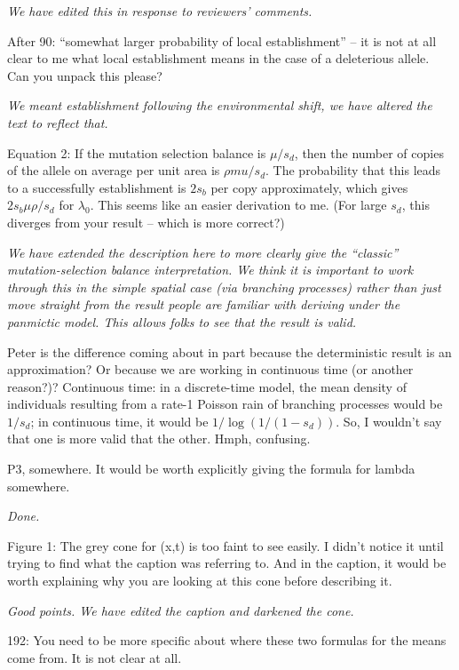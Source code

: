 \documentclass[12pt,letterpaper]{article}
\newcommand{\gc}[1]{{ \color{red} #1}}
\newcommand{\plr}[1]{{ \color{green} #1}}
\newcommand{\response}[1]{\emph{ \color{blue} #1}}
\begin{document}
\response{We have edited this in response to reviewers' comments.}


After 90: ``somewhat larger probability of local establishment'' -- it is not at all clear to me what local establishment means in the case of a deleterious allele. Can you unpack this please?

\response{We meant establishment following the environmental shift, we have altered the text to reflect that.}

Equation 2: If the mutation selection balance is $\mu/s_d$, then the number of copies of the allele on average per unit area is $\rho mu/ s_d$. The probability that this leads to a successfully establishment is $2 s_b$ per copy approximately, which gives $2 s_b \mu \rho / s_d$ for $\lambda_0$. This seems like an easier derivation to me. (For large $s_d$, this diverges from your result -- which is more correct?)

\response{We have extended the description here to more clearly give the ``classic'' mutation-selection balance interpretation. We think it is important to work through this in the simple spatial case (via branching processes) rather than just move straight from the result people are familiar with deriving under the panmictic model. This allows folks to see that the result is valid. }

\gc{Peter is the difference coming about in part because the deterministic result is an approximation? Or because we are working in continuous time (or another reason?)?}
\plr{Continuous time: in a discrete-time model, the mean density of individuals resulting from a rate-1 Poisson rain of branching processes would be $1/s_d$; in continuous time, it would be $1/\log(1/(1-s_d))$.  So, I wouldn't say that one is more valid that the other.  Hmph, confusing.}

P3, somewhere. It would be worth explicitly giving the formula for lambda somewhere.

\response{Done.}

Figure 1: The grey cone for (x,t) is too faint to see easily. I didn't notice it until trying to find what the caption was referring to. And in the caption, it would be worth explaining why you are looking at this cone before describing it. 

\response{Good points. We have edited the caption and darkened the cone. }

192: You need to be more specific about where these two formulas for the means come from. It is not clear at all.
\end{document}
